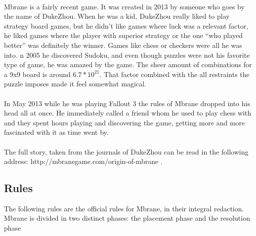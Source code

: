 \documentclass[a4paper]{article}
\begin{document}
\paragraph{}
Mbrane is a fairly recent game. It was created in 2013 by someone who goes by the name of DukeZhou. 
When he was a kid, DukeZhou really liked to play strategy board games, but he didn’t like games where luck was a 
relevant factor, he liked games where the player with superior strategy or the one “who played better” was definitely the winner. 
Games like chess or checkers were all he was into. n 2005 he discovered Sudoku, and even though puzzles were not his favorite type 
of game, he was amazed by the game. The sheer amount of combinations for a 9x9 board is around $6.7*10^21$. That factor combined with 
the all restraints the puzzle imposes made it feel somewhat magical.

\paragraph{}
In May 2013 while he was playing Fallout 3 the rules of Mbrane dropped into his head all at once. He immediately called a friend whom
he used to play chess with and they spent hours playing and discovering the game, getting more and more fascinated with it as time went by.

\paragraph{}
The full story, taken from the journals of DukeZhou can be read in the following address: 
http://mbranegame.com/origin-of-mbrane \cite{Origin}.

\subsection{Rules}
The following rules are the official rules for Mbrane, in their integral redaction.
Mbrane is divided in two distinct phases: the placement phase and the resolution phase
\end{document}
